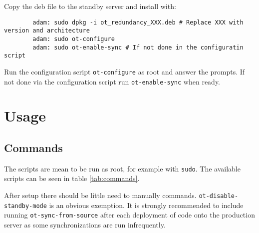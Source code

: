 \documentclass[a4paper]{article}
\begin{document}
	Copy the deb file to the standby server and install with:
	\begin{verbatim}
		adam: sudo dpkg -i ot_redundancy_XXX.deb # Replace XXX with version and architecture
		adam: sudo ot-configure
		adam: sudo ot-enable-sync # If not done in the configuratin script
	\end{verbatim}
	Run the configuration script \texttt{ot-configure} as root and answer the prompts. If not done via the configuration script run \texttt{ot-enable-sync} when ready.
	
\section{Usage}

\subsection{Commands}
The scripts are mean to be run as root, for example with \texttt{sudo}. The available scripts can be seen in table \ref{tab:commands}.

After setup there should be little need to manually commands. \texttt{ot-disable-standby-mode} is an obvious exemption. It is strongly recommended to include running \texttt{ot-sync-from-source} after each deployment of code onto the production server as some synchronizations are run infrequently.
\end{document}
